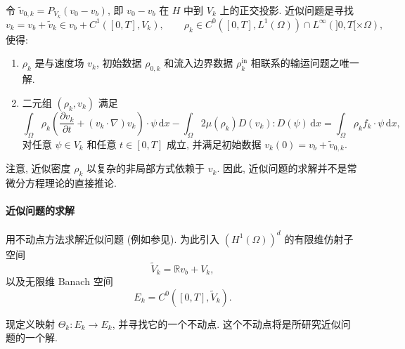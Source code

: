 \begin{sloppypar}
\begin{Definition}
\label{def:chap6-approximate-problem}
令 $\widetilde v_{0,k}=P_{V_k}(v_0-v_b)$, 即 $v_0-v_b$ 在 $H$ 中到 $V_k$ 上的正交投影. 近似问题是寻找
\[
 v_k=v_b+\widetilde v_k\in v_b+C^1([0,T],V_k),
 \qquad
 \rho_k\in C^0([0,T],L^1(\Omega))\cap L^\infty(]0,T[\times\Omega),
\]
使得:
\begin{enumerate}
 \item $\rho_k$ 是与速度场 $v_k$, 初始数据 $\rho_{0,k}$ 和流入边界数据 $\rho_k^{\mathrm{in}}$ 相联系的输运问题之唯一解.
 \item 二元组 $(\rho_k,v_k)$ 满足
 \begin{equation}
  \int_\Omega\rho_k\left(\frac{\partial v_k}{\partial t}+(v_k\cdot\nabla)v_k\right)\cdot\psi\,\mathrm dx
  -\int_\Omega2\mu(\rho_k)D(v_k):D(\psi)\,\mathrm dx
  =\int_\Omega\rho_kf_k\cdot\psi\,\mathrm dx,
 \label{eq:chap6-approximate-momentum}
 \end{equation}
 对任意 $\psi\in V_k$ 和任意 $t\in[0,T]$ 成立, 并满足初始数据 $v_k(0)=v_b+\widetilde v_{0,k}$.
\end{enumerate}
\end{Definition}

注意, 近似密度 $\rho_k$ 以复杂的非局部方式依赖于 $v_k$. 因此, 近似问题的求解并不是常微分方程理论的直接推论.

\paragraph{近似问题的求解}
\label{subsec:chap6-approximate-problem-resolution}

用不动点方法求解近似问题 (例如参见). 为此引入 $(H^1(\Omega))^d$ 的有限维仿射子空间
\[
 \widetilde V_k=\mathbb Rv_b+V_k,
\]
以及无限维 Banach 空间
\[
 E_k=C^0([0,T],\widetilde V_k).
\]

现定义映射 $\Theta_k:E_k\to E_k$, 并寻找它的一个不动点. 这个不动点将是所研究近似问题的一个解.


\end{sloppypar}
